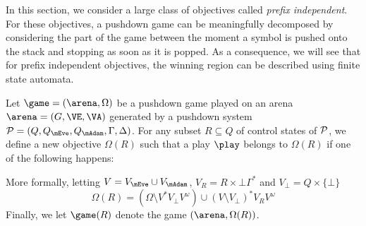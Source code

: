 In this section, we consider a large class of objectives called \emph{prefix independent}. For these objectives, a pushdown game can be meaningfully decomposed by considering the part of the game between the moment a symbol is pushed onto the stack and stopping as soon as it is popped.  As a consequence, we will see that for prefix independent
objectives, the winning region can be described  using finite state automata.





Let $\game=(\arena,\Omega)$ be a pushdown game played on an arena $\arena = (G,\VE,\VA)$ generated by a pushdown system $\PDS = (Q,Q_{\mEve}, Q_{\mAdam}, \Gamma,\Delta)$. For any subset $R\subseteq Q$ of control states of $\mathcal{P}$, we define a new objective $\Omega(R)$ such that a play $\play$ belongs to $\Omega(R)$ if one of the following happens:


More formally, letting $V=V_\mEve\cup V_\mAdam$, $V_R = R \times \bot \Gamma^*$ and $V_\bot = Q \times \{\bot\}$ 
$$ \Omega(R) = (\Omega \setminus V^*V_\bot V^\omega)\cup (V \setminus V_\bot)^* V_R V^\omega$$
Finally, we let $\game(R)$ denote the game $(\arena,\Omega(R))$.

